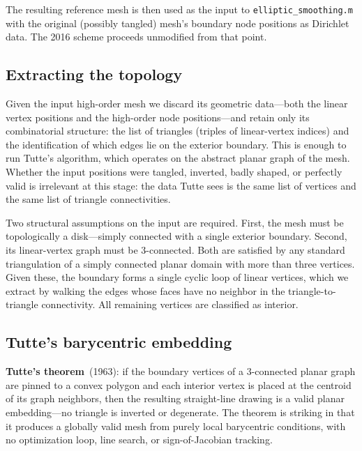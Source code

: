 \documentclass[11pt]{article}
\begin{document}
The resulting reference mesh is then used as the input to
\texttt{elliptic\_smoothing.m} with the original (possibly tangled)
mesh's boundary node positions as Dirichlet data. The 2016 scheme
proceeds unmodified from that point.

\subsection{Extracting the topology}
\label{sec:tutte-topology}

Given the input high-order mesh we discard its geometric data---both
the linear vertex positions and the high-order node
positions---and retain only its combinatorial structure: the list of
triangles (triples of linear-vertex indices) and the identification
of which edges lie on the exterior boundary. This is enough to run
Tutte's algorithm, which operates on the abstract planar graph of
the mesh. Whether the input positions were tangled, inverted, badly
shaped, or perfectly valid is irrelevant at this stage: the data
Tutte sees is the same list of vertices and the same list of
triangle connectivities.

Two structural assumptions on the input are required. First, the
mesh must be topologically a disk---simply connected with a single
exterior boundary. Second, its linear-vertex graph must be
$3$-connected. Both are satisfied by any standard triangulation of a
simply connected planar domain with more than three vertices. Given
these, the boundary forms a single cyclic loop of linear vertices,
which we extract by walking the edges whose faces have no neighbor
in the triangle-to-triangle connectivity. All remaining vertices are
classified as interior.

\subsection{Tutte's barycentric embedding}
\label{sec:tutte-embedding}

\textbf{Tutte's theorem}~(1963): if the boundary vertices of a
$3$-connected planar graph are pinned to a convex polygon and each
interior vertex is placed at the centroid of its graph neighbors,
then the resulting straight-line drawing is a valid planar
embedding---no triangle is inverted or degenerate. The theorem is
striking in that it produces a globally valid mesh from purely local
barycentric conditions, with no optimization loop, line search, or
sign-of-Jacobian tracking.
\end{document}
